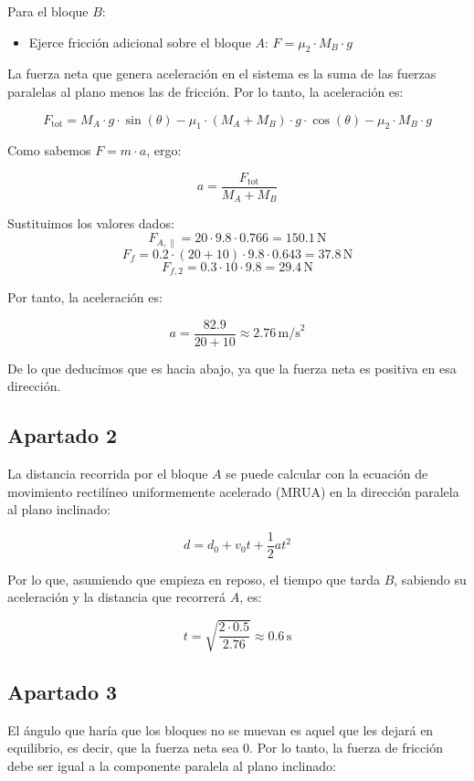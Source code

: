 \documentclass[a4paper,12pt]{article} %
\begin{document}
Para el bloque \( B \):
\begin{itemize}
    \item Ejerce fricción adicional sobre el bloque \( A \): \( F = \mu_2 \cdot M_B \cdot g \)
\end{itemize}

La fuerza neta que genera aceleración en el sistema es la suma de las fuerzas paralelas al plano menos las de fricción. Por lo tanto, la aceleración es:

\[
F_{\text{tot}} = M_A \cdot g \cdot \sin(\theta) - \mu_1 \cdot (M_A + M_B) \cdot g \cdot \cos(\theta) - \mu_2 \cdot M_B \cdot g
\]

Como sabemos \( F = m \cdot a \), ergo:

\[
a = \frac{F_{\text{tot}}}{M_A + M_B}
\]

Sustituimos los valores dados:
\[
F_{A,\parallel} = 20 \cdot 9.8 \cdot 0.766 = 150.1 \, \text{N}
\]
\[
F_f = 0.2 \cdot (20 + 10) \cdot 9.8 \cdot 0.643 = 37.8 \, \text{N}
\]
\[
F_{f,2} = 0.3 \cdot 10 \cdot 9.8 = 29.4 \, \text{N}
\]

Por tanto, la aceleración es:

\[
a = \frac{82.9}{20 + 10} \approx 2.76 \, \text{m/s}^2
\]

De lo que deducimos que es hacia abajo, ya que la fuerza neta es positiva en esa dirección.

\subsection*{Apartado 2}
La distancia recorrida por el bloque \( A \) se puede calcular con la ecuación de movimiento rectilíneo uniformemente acelerado (MRUA) en la dirección paralela al plano inclinado:

\[
d = d_0 + v_0 t + \frac{1}{2} a t^2
\]

Por lo que, asumiendo que empieza en reposo, el tiempo que tarda \( B \), sabiendo su aceleración y la distancia que recorrerá \( A \), es:

\[
t = \sqrt{\frac{2 \cdot 0.5}{2.76}} \approx 0.6 \, \text{s}
\]

\subsection*{Apartado 3}
El ángulo que haría que los bloques no se muevan es aquel que les dejará en equilibrio, es decir, que la fuerza neta sea \( 0 \). Por lo tanto, la fuerza de fricción debe ser igual a la componente paralela al plano inclinado:
\end{document}
